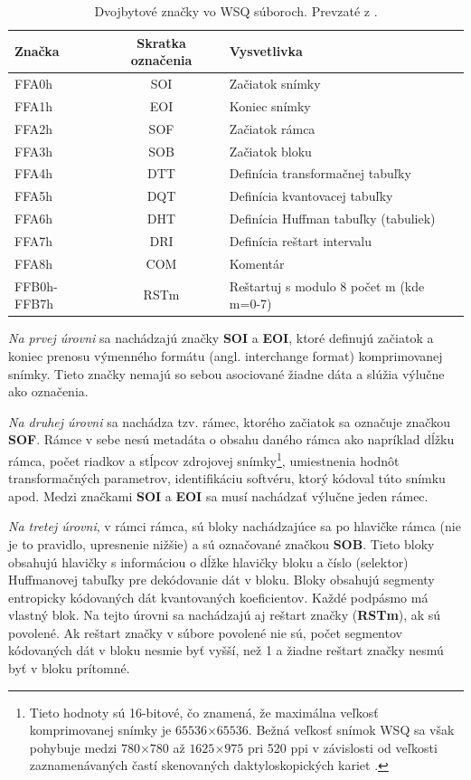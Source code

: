   \begin{table}[ht]
    \centering
    \caption{Dvojbytové značky vo WSQ súboroch. Prevzaté z \cite{WSQSpecification}.}
    \begin{tabular}{ |l c l| }
      \hline
      Značka & Skratka označenia & Vysvetlivka \\
      \hline
      FFA0h       & SOI  & Začiatok snímky \\
      FFA1h       & EOI  & Koniec snímky \\
      FFA2h       & SOF  & Začiatok rámca \\
      FFA3h       & SOB  & Začiatok bloku \\
      FFA4h       & DTT  & Definícia transformačnej tabuľky \\
      FFA5h       & DQT  & Definícia kvantovacej tabuľky \\
      FFA6h       & DHT  & Definícia Huffman tabuľky (tabuliek) \\
      FFA7h       & DRI  & Definícia reštart intervalu \\
      FFA8h       & COM  & Komentár \\
      FFB0h-FFB7h & RSTm & Reštartuj s modulo 8 počet m (kde m=0-7) \\
      \hline
    \end{tabular}
    \label{tab:znacky_WSQ_suboru}
  \end{table}

  \emph{Na prvej úrovni} sa nachádzajú značky \textbf{SOI} a \textbf{EOI}, ktoré definujú začiatok a koniec prenosu výmenného formátu
  (angl. interchange format) komprimovanej snímky. Tieto značky nemajú so sebou asociované žiadne dáta a slúžia výlučne ako označenia.

  \emph{Na druhej úrovni} sa nachádza tzv. rámec, ktorého začiatok sa označuje značkou \textbf{SOF}. Rámce v sebe nesú metadáta o obsahu daného rámca ako
  napríklad dĺžku rámca, počet riadkov a stĺpcov zdrojovej snímky\footnote{Tieto hodnoty sú 16-bitové, čo znamená, že maximálna veľkosť komprimovanej snímky
  je $65536$$\times{}$$65536$. Bežná veľkosť snímok WSQ sa však pohybuje medzi $780$$\times{}$$780$ až $1625$$\times{}$$975$ pri 520 ppi v závislosti od veľkosti
  zaznamenávaných častí skenovaných daktyloskopických kariet \cite{hopper_wsq_format}.}, umiestnenia hodnôt transformačných parametrov, identifikáciu softvéru,
  ktorý kódoval túto snímku apod. Medzi značkami \textbf{SOI} a \textbf{EOI} sa musí nachádzať výlučne jeden rámec.

  \emph{Na tretej úrovni}, v rámci rámca, sú bloky nachádzajúce sa po hlavičke rámca (nie je to pravidlo, upresnenie nižšie) a sú označované značkou
  \textbf{SOB}. Tieto bloky obsahujú hlavičky s informáciou o dĺžke hlavičky bloku a číslo (selektor) Huffmanovej tabuľky pre dekódovanie dát v bloku.
  Bloky obsahujú segmenty entropicky kódovaných dát kvantovaných koeficientov. Každé podpásmo má vlastný blok. Na tejto úrovni sa nachádzajú aj reštart
  značky (\textbf{RSTm}), ak sú povolené. Ak reštart značky v súbore povolené nie sú, počet segmentov kódovaných dát v bloku nesmie byť vyšší, než 1
  a žiadne reštart značky nesmú byť v bloku prítomné.

